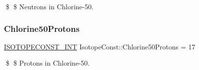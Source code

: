 \$ \$ Neutrons in Chlorine-\/50. \mbox{\label{group___isotope_const-_chlorine-_cl50_ga8c0240d4ddc162a26765b183a109325b}} 
\subsubsection{\texorpdfstring{Chlorine50\+Protons}{Chlorine50Protons}}
{\footnotesize\ttfamily \mbox{\hyperlink{group___isotope_const-_macros_ga5f18360b3e99483a35c32d789e62621c}{I\+S\+O\+T\+O\+P\+E\+C\+O\+N\+S\+T\+\_\+\+I\+NT}} Isotope\+Const\+::\+Chlorine50\+Protons = 17}

\$ \$ Protons in Chlorine-\/50. 